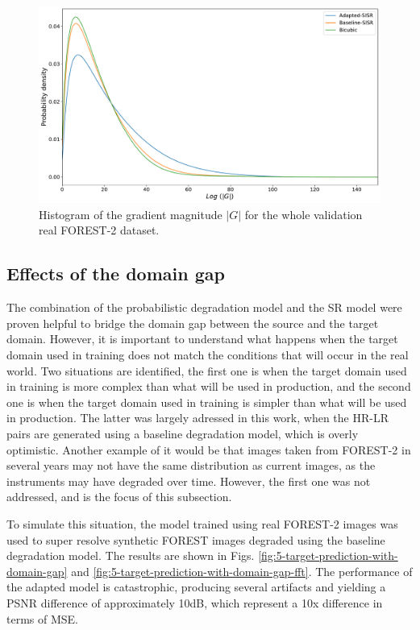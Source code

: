         \begin{figure}[H]
            \centering
            \includegraphics[scale=0.4]{Includes/5-gradient-histogram-validation-dataset.pdf}
            \caption{Histogram of the gradient magnitude $|G|$ for the whole validation real FOREST-2 dataset.}
            \label{fig:5-gradient-histogram-validation-dataset}
        \end{figure}

    \subsection{Effects of the domain gap}

        The combination of the probabilistic degradation model and the SR model were proven helpful to bridge the domain gap between the source and the target domain.
        However, it is important to understand what happens when the target domain used in training does not match the conditions that will occur in the real world.
        Two situations are identified, the first one is when the target domain used in training is more complex than what will be used in production, and the second one is when the target domain used in training is simpler than what will be used in production.
        The latter was largely adressed in this work, when the HR-LR pairs are generated using a baseline degradation model, which is overly optimistic. 
        Another example of it would be that images taken from FOREST-2 in several years may not have the same distribution as current images, as the instruments may have degraded over time.
        However, the first one was not addressed, and is the focus of this subsection.
        
        To simulate this situation, the model trained using real FOREST-2 images was used to super resolve synthetic FOREST images degraded using the baseline degradation model.
        The results are shown in Figs. \ref{fig:5-target-prediction-with-domain-gap} and \ref{fig:5-target-prediction-with-domain-gap-fft}.
        The performance of the adapted model is catastrophic, producing several artifacts and yielding a PSNR difference of approximately 10dB, which represent a 10x difference in terms of MSE.

